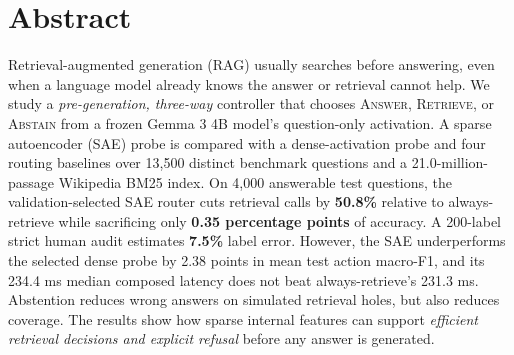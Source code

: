 \documentclass[11pt,a4paper,twocolumn]{article}
\begin{document}

\section*{Abstract}
Retrieval-augmented generation (RAG) usually searches before answering, even when a language model already knows the answer or retrieval cannot help. We study a \emph{pre-generation, three-way} controller that chooses \textsc{Answer}, \textsc{Retrieve}, or \textsc{Abstain} from a frozen Gemma 3 4B model's question-only activation. A sparse autoencoder (SAE) probe is compared with a dense-activation probe and four routing baselines over 13,500 distinct benchmark questions and a 21.0-million-passage Wikipedia BM25 index. On 4,000 answerable test questions, the validation-selected SAE router cuts retrieval calls by \textbf{50.8\%} relative to always-retrieve while sacrificing only \textbf{0.35 percentage points} of accuracy. A 200-label strict human audit estimates \textbf{7.5\%} label error. However, the SAE underperforms the selected dense probe by 2.38 points in mean test action macro-F1, and its 234.4 ms median composed latency does not beat always-retrieve's 231.3 ms. Abstention reduces wrong answers on simulated retrieval holes, but also reduces coverage. The results show how sparse internal features can support \emph{efficient retrieval decisions and explicit refusal} before any answer is generated.
\end{document}
